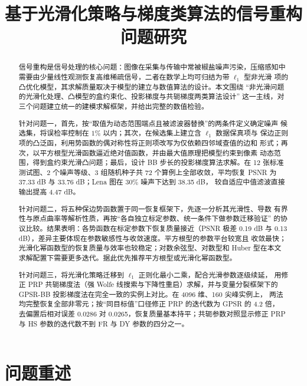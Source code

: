 \documentclass[withoutpreface,bwprint]{cumcmthesis}
\title{基于光滑化策略与梯度类算法的信号重构问题研究}
\begin{document}
\maketitle

\begin{abstract}
信号重构是信号处理的核心问题：图像在采集与传输中常被椒盐噪声污染，压缩感知中
需要由少量线性观测恢复高维稀疏信号，二者在数学上均可归结为带 $\ell_1$ 型非光滑
项的凸优化模型，其求解质量取决于模型的建立与数值算法的设计。本文围绕
``非光滑问题的光滑化处理、凸模型的盒约束化、投影梯度与共轭梯度两类算法设计''
这一主线，对三个问题建立统一的建模求解框架，并给出完整的数值检验。

针对问题一，首先，按``取值为动态范围端点且被滤波器替换''的两条件定义确定噪声
候选集，将误检率控制在 $1\%$ 以内；其次，在候选集上建立含 $\ell_1$ 数据保真项与
保边正则项的凸泛函，利用势函数的偶对称性将正则项改写为仅依赖四邻域查值的边和
形式；再次，以平方根型光滑函数逼近绝对值函数，并由最大值原理把模型约束到像素
动态范围，得到盒约束光滑凸问题；最后，设计 BB 步长的投影梯度算法求解。在
12 张标准测试图、2 个噪声等级、3 组随机种子共 72 个算例上全部收敛，平均恢复
PSNR 为 37.33 dB 与 33.76 dB；Lena 图在 30\% 噪声下达到 38.35 dB，
较自适应中值滤波直接输出提高 4.47 dB。

针对问题二，将五种保边势函数置于同一恢复框架下，先逐一分析其光滑性、导数
有界性与原点曲率等解析性质，再按``各自独立标定参数、统一条件下做参数迁移验证''
的协议比较。结果表明：各势函数在标定参数下恢复质量接近（PSNR 极差 0.19 dB 与
0.13 dB），差异主要体现在参数敏感性与收敛速度。平方根型的参数平台较宽且
收敛最快；光滑化幂函数型的恢复质量与效率也较稳定；对数余弦型、对数型和
Huber 型在本文求解配置下需要更多迭代。据此优先推荐平方根型或光滑化幂函数型。

针对问题三，将光滑化策略迁移到 $\ell_1$ 正则化最小二乘，配合光滑参数逐级续延，
用修正 PRP 共轭梯度法（强 Wolfe 线搜索与下降性重启）求解，并与变量分裂框架下的
GPSR-BB 投影梯度法在完全一致的实例上对比。在 4096 维、160 尖峰实例上，
两法均完整恢复全部非零元；按``同目标值''口径修正 PRP 的迭代数为 GPSR 的 4.2 倍，
去偏置后相对误差 0.0286 对 0.0265，恢复质量基本持平；共轭参数对照显示修正 PRP
与 HS 参数的迭代数不到 FR 与 DY 参数的四分之一。

\end{abstract}


\section{问题重述}
\end{document}
